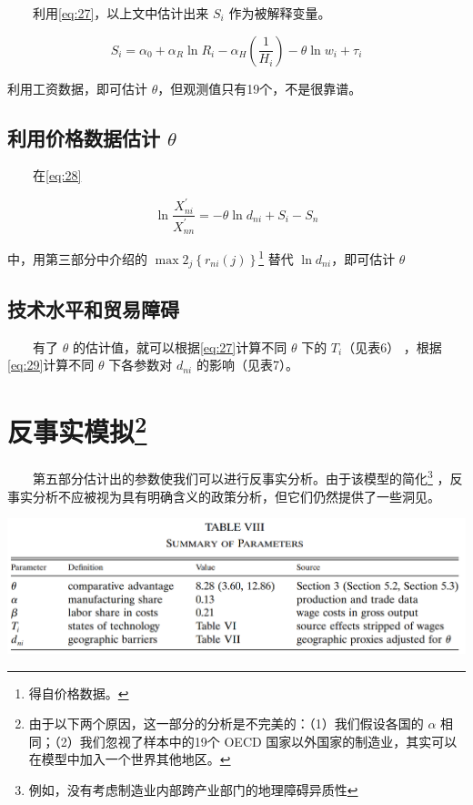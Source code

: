 \documentclass[
]{article}
\begin{document}
　　利用\eqref{eq:27}，以上文中估计出来 \(S_i\) 作为被解释变量。

\[
S_{i}=\alpha_{0}+\alpha_{R} \ln R_{i}-\alpha_{H}\left(\frac{1}{H_{i}}\right)-\theta \ln w_{i}+\tau_{i}
\]

利用工资数据，即可估计 \(\theta\)，但观测值只有19个，不是很靠谱。

\hypertarget{ux5229ux7528ux4ef7ux683cux6570ux636eux4f30ux8ba1-theta}{%
\subsection{\texorpdfstring{利用价格数据估计 \(\theta\)}{利用价格数据估计 \textbackslash theta}}\label{ux5229ux7528ux4ef7ux683cux6570ux636eux4f30ux8ba1-theta}}

　　在\eqref{eq:28}

\[\ln \frac{X_{n i}^{\prime}}{X_{n n}^{\prime}}=-\theta \ln d_{n i}+S_i-S_n\]

中，用第三部分中介绍的 \(\max 2_{j}\left\{r_{n i}(j)\right\}\)\footnote{得自价格数据。} 替代 \(\ln d_{n i}\)，即可估计 \(\theta\)

\hypertarget{ux6280ux672fux6c34ux5e73ux548cux8d38ux6613ux969cux788d}{%
\subsection{技术水平和贸易障碍}\label{ux6280ux672fux6c34ux5e73ux548cux8d38ux6613ux969cux788d}}

　　有了 \(\theta\) 的估计值，就可以根据\eqref{eq:27}计算不同 \(\theta\) 下的 \(T_i\)（见表6） ，根据\eqref{eq:29}计算不同 \(\theta\) 下各参数对 \(d_{ni}\) 的影响（见表7）。

\hypertarget{ux53cdux4e8bux5b9eux6a21ux62df}{%
\section[反事实模拟]{\texorpdfstring{反事实模拟\footnote{由于以下两个原因，这一部分的分析是不完美的：（1）我们假设各国的 \(\alpha\) 相同；（2）我们忽视了样本中的19个 OECD 国家以外国家的制造业，其实可以在模型中加入一个世界其他地区。}}{反事实模拟}}\label{ux53cdux4e8bux5b9eux6a21ux62df}}

　　第五部分估计出的参数使我们可以进行反事实分析。由于该模型的简化\footnote{例如，没有考虑制造业内部跨产业部门的地理障碍异质性} ，反事实分析不应被视为具有明确含义的政策分析，但它们仍然提供了一些洞见。

\begin{center}\includegraphics[width=1\linewidth]{Figures/Table8} \end{center}
\end{document}
